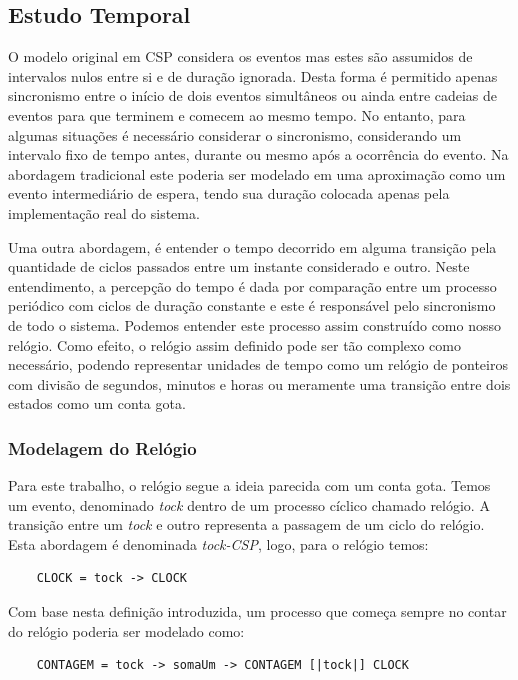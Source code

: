 \documentclass[a4paper,11pt,twocolumns]{article}
\begin{document}
\subsection{Estudo Temporal}
O modelo original em CSP considera os eventos mas estes são assumidos de intervalos nulos entre si e de duração ignorada. Desta forma é permitido apenas sincronismo entre o início de dois eventos simultâneos ou ainda entre cadeias de eventos para que terminem e comecem ao mesmo tempo. No entanto, para algumas situações é necessário considerar o sincronismo, considerando um intervalo fixo de tempo antes, durante ou mesmo após a ocorrência do evento. Na abordagem tradicional este poderia ser modelado em uma aproximação como um evento intermediário de espera, tendo sua duração colocada apenas pela implementação real do sistema.

Uma outra abordagem, é entender o tempo decorrido em alguma transição pela quantidade de ciclos passados entre um instante considerado e outro. Neste entendimento, a percepção do tempo é dada por comparação entre um processo periódico com ciclos de duração constante e este é responsável pelo sincronismo de todo o sistema. Podemos entender este processo assim construído como nosso relógio. Como efeito, o relógio assim definido pode ser tão complexo como necessário, podendo representar unidades de tempo como um relógio de ponteiros com divisão de segundos, minutos e horas ou meramente uma transição entre dois estados como um conta gota.

\subsubsection{Modelagem do Relógio}
Para este trabalho, o relógio segue a ideia parecida com um conta gota. Temos um evento, denominado \textit{tock} dentro de um processo cíclico chamado relógio. A transição entre um \textit{tock} e outro representa a passagem de um ciclo do relógio. Esta abordagem é denominada \textit{tock-CSP}\cite{fdrManual}, logo, para o relógio temos:

\begin{verbatim}
    CLOCK = tock -> CLOCK
\end{verbatim}

Com base nesta definição introduzida, um processo que começa sempre no contar do relógio poderia ser modelado como:
\begin{verbatim}
    CONTAGEM = tock -> somaUm -> CONTAGEM [|tock|] CLOCK
\end{verbatim}
\end{document}
